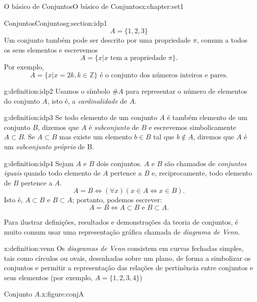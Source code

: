 \documentclass[oneside,10pt,]{book}
\numberwithin{equation}{section}
\begin{document}
\begin{chapterptx}{O básico de Conjuntos}{}{O básico de Conjuntos}{}{}{x:chapter:set1}
\begin{sectionptx}{Conjuntos}{}{Conjuntos}{}{}{g:section:idp1}
%
\begin{equation*}
A = \{ 1, 2, 3 \} 
\end{equation*}
Um conjunto também pode ser descrito por uma propriedade \(\pi\), comum a todos os seus elementos e escrevemos%
%
\begin{equation*}
A = \{ x|x \text{ tem a propriedade } \pi \}. 
\end{equation*}
Por exemplo,%
\begin{equation*}
A = \{ x|x = 2k, k\in\mathbb{Z} \} \text{ é o conjunto dos números inteiros e pares}. 
\end{equation*}
%
\begin{definition}{}{g:definition:idp2}%
Usamos o símbolo \(\#A\) para representar o número de elementos do conjunto \(A\), isto é, a \emph{cardinalidade} de \(A\).%
\end{definition}
\begin{definition}{}{g:definition:idp3}%
Se todo elemento de um conjunto \(A\) é também elemento de um conjunto \(B\), dizemos que \(A\)  é \emph{subconjunto} de \(B\) e escrevemos simbolicamente \(A\subset B\). Se \(A\subset B\) mas existe um elemento \(b\in B\) tal que \(b\notin A\), diremos que \(A\) é um \emph{subconjunto próprio} de B.%
\end{definition}
\begin{definition}{}{g:definition:idp4}%
Sejam \(A\) e \(B\) dois conjuntos. \(A\) e \(B\) são chamados de \emph{conjuntos iguais} quando todo elemento de \(A\) pertence a \(B\) e, reciprocamente, todo elemento de \(B\) pertence a \(A\).%
%
\begin{equation*}
A=B \Leftrightarrow (\forall x)(x \in A \Leftrightarrow x \in B ).
\end{equation*}
Isto é, \(A\subset B\) e \(B\subset A\); portanto, podemos escrever:%
\begin{equation*}
A=B \Leftrightarrow  A \subset B \text{ e } B \subset A.
\end{equation*}
\end{definition}
Para ilustrar definições, resultados e demonstrações da teoria de conjuntos, é muito comum usar uma representação gráfica chamada de \emph{diagrama de Venn}.%
\begin{definition}{}{x:definition:venn}%
Os \emph{diagramas de Venn} consistem em curvas fechadas simples, tais como círculos ou ovais, desenhadas sobre um plano, de forma a simbolizar os conjuntos e permitir a representação das relações de pertinência entre conjuntos e seus elementos (por exemplo, \(A = \{1, 2, 3, 4\}\)) \begin{figureptx}{Conjunto \(A\).}{x:figure:conjA}{}%

\end{figureptx}
\end{definition}
\end{sectionptx}
\end{chapterptx}
\end{document}
